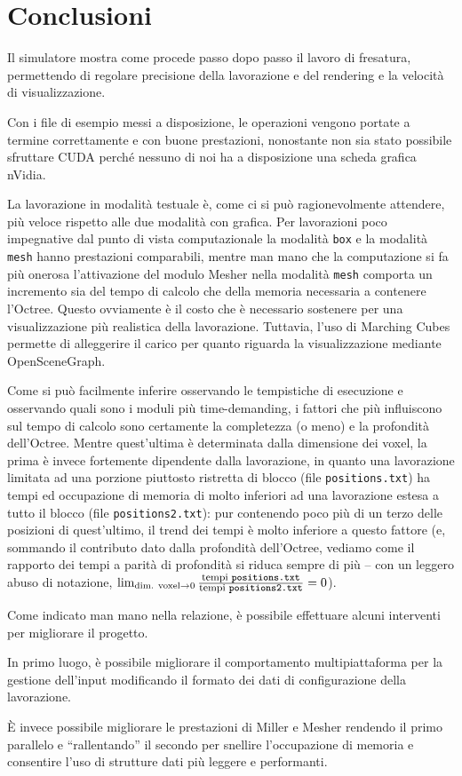\section{Conclusioni}
Il simulatore mostra come procede passo dopo passo il lavoro di fresatura, permettendo di regolare precisione della lavorazione e del rendering e la velocità di visualizzazione.

Con i file di esempio messi a disposizione, le operazioni vengono portate a termine correttamente e con buone prestazioni, nonostante non sia stato possibile sfruttare CUDA perché nessuno di noi ha a disposizione una scheda grafica nVidia.

La lavorazione in modalità testuale è, come ci si può ragionevolmente attendere, più veloce rispetto alle due modalità con grafica. Per lavorazioni poco impegnative dal punto di vista computazionale la modalità \texttt{box} e la modalità \texttt{mesh} hanno prestazioni comparabili, mentre man mano che la computazione si fa più onerosa l'attivazione del modulo Mesher nella modalità \texttt{mesh} comporta un incremento sia del tempo di calcolo che della memoria necessaria a contenere l'Octree. Questo ovviamente è il costo che è necessario sostenere per una visualizzazione più realistica della lavorazione. Tuttavia, l'uso di Marching Cubes permette di alleggerire il carico per quanto riguarda la visualizzazione mediante OpenSceneGraph.

Come si può facilmente inferire osservando le tempistiche di esecuzione e osservando quali sono i moduli più time-demanding, i fattori che più influiscono sul tempo di calcolo sono certamente la completezza (o meno) e la profondità dell'Octree. Mentre quest'ultima è determinata dalla dimensione dei voxel, la prima è invece fortemente dipendente dalla lavorazione, in quanto una lavorazione limitata ad una porzione piuttosto ristretta di blocco (file \texttt{positions.txt}) ha tempi ed occupazione di memoria di molto inferiori ad una lavorazione estesa a tutto il blocco (file \texttt{positions2.txt}): pur contenendo poco più di un terzo delle posizioni di quest'ultimo, il trend dei tempi è molto inferiore a questo fattore (e, sommando il contributo dato dalla profondità dell'Octree, vediamo come il rapporto dei tempi a parità di profondità si riduca sempre di più -- con un leggero abuso di notazione, $\lim_{\mbox{{\scriptsize dim. voxel}} \rightarrow 0}\frac{\mbox{\footnotesize{tempi \texttt{positions.txt}}}}{\mbox{\footnotesize{tempi \texttt{positions2.txt}}}} = 0$).

Come indicato man mano nella relazione, è possibile effettuare alcuni interventi per migliorare il progetto.

In primo luogo, è possibile migliorare il comportamento multipiattaforma per la gestione dell'input modificando il formato dei dati di configurazione della lavorazione.

È invece possibile migliorare le prestazioni di Miller e Mesher rendendo il primo parallelo e ``rallentando'' il secondo per snellire l'occupazione di memoria e consentire l'uso di strutture dati più leggere e performanti.
